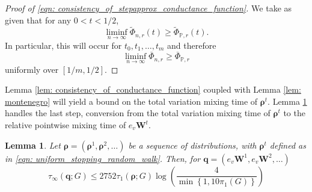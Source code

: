 \documentclass{article}
\newcommand{\1}{\mathbf{1}}
\newcommand{\qbf}{\mathbf{q}}
\newcommand{\rhobf}{\bm{\rho}}
\newcommand{\Wbf}{\mathbf{W}}
\newcommand{\Pbb}{\mathbb{P}}
\theoremstyle{aldenthm}
\newtheorem{lemma}{Lemma}
\begin{document}
\begin{proof}[Proof of \eqref{eqn: consistency_of_stepapprox_conductance_function}]
We take as given that for any $0 < t < 1/2$,
\begin{equation*}
\liminf_{n \to \infty} \widetilde{\Phi}_{n,r}(t) \geq \widetilde{\Phi}_{\Pbb,r}(t).
\end{equation*}
In particular, this will occur for $t_0, t_1, \ldots, t_m$ and therefore
\begin{equation*}
\liminf_{n \to \infty} \overline{\Phi}_{n,r} \geq \overline{\Phi}_{\Pbb,r}
\end{equation*}
uniformly over $[1/m,1/2]$.
\end{proof}

Lemma \ref{lem: consistency_of_conductance_function} coupled with Lemma \ref{lem: montenegro} will yield a bound on the total variation mixing time of $\rhobf^t$. Lemma \ref{lem: tv_mixing_to_pointwise_mixing} handles the last step, conversion from the total variation mixing time of $\rhobf^t$ to the relative pointwise mixing time of $e_v \Wbf^t$. 
\begin{lemma}
\label{lem: tv_mixing_to_pointwise_mixing}
	Let $\rhobf = (\rhobf^1, \rhobf^2, \ldots)$ be a sequence of distributions, with $\rhobf^t$ defined as in \eqref{eqn: uniform_stopping_random_walk}. Then, for $\qbf = (e_v\Wbf^1, e_v\Wbf^2, \ldots)$
	\begin{equation*}
	\tau_{\infty}(\qbf; G) \leq 2752 \tau_1(\rhobf; G) \log \left(\frac{4}{\min\left\{1,10 \pi_1(G)\right\}}\right)
	\end{equation*}
\end{lemma}
\end{document}
